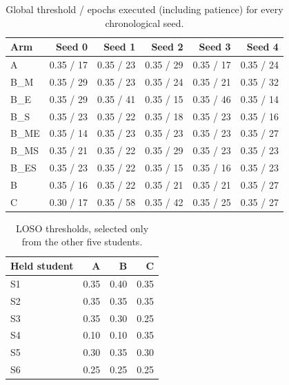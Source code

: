 \begin{table}[htbp]\centering\small
\caption{Global threshold / epochs executed (including patience) for every chronological seed.}\label{tab:thresholds}
\begin{tabular}{@{}lrrrrr@{}}\toprule
Arm & Seed 0 & Seed 1 & Seed 2 & Seed 3 & Seed 4\\\midrule
A & 0.35 / 17 & 0.35 / 23 & 0.35 / 29 & 0.35 / 17 & 0.35 / 24\\
B\_M & 0.35 / 29 & 0.35 / 23 & 0.35 / 24 & 0.35 / 21 & 0.35 / 32\\
B\_E & 0.35 / 29 & 0.35 / 41 & 0.35 / 15 & 0.35 / 46 & 0.35 / 14\\
B\_S & 0.35 / 23 & 0.35 / 22 & 0.35 / 18 & 0.35 / 23 & 0.35 / 16\\
B\_ME & 0.35 / 14 & 0.35 / 23 & 0.35 / 23 & 0.35 / 23 & 0.35 / 27\\
B\_MS & 0.35 / 21 & 0.35 / 22 & 0.35 / 29 & 0.35 / 23 & 0.35 / 23\\
B\_ES & 0.35 / 23 & 0.35 / 22 & 0.35 / 15 & 0.35 / 16 & 0.35 / 23\\
B & 0.35 / 16 & 0.35 / 22 & 0.35 / 21 & 0.35 / 21 & 0.35 / 27\\
C & 0.30 / 17 & 0.35 / 58 & 0.35 / 42 & 0.35 / 25 & 0.35 / 27\\
\bottomrule\end{tabular}\end{table}
\begin{table}[htbp]\centering\small
\caption{LOSO thresholds, selected only from the other five students.}\label{tab:losothresholds}
\begin{tabular}{@{}lrrr@{}}\toprule
Held student & A & B & C\\\midrule
S1 & 0.35 & 0.40 & 0.35\\
S2 & 0.35 & 0.35 & 0.35\\
S3 & 0.35 & 0.30 & 0.25\\
S4 & 0.10 & 0.10 & 0.35\\
S5 & 0.30 & 0.35 & 0.30\\
S6 & 0.25 & 0.25 & 0.25\\
\bottomrule\end{tabular}\end{table}
